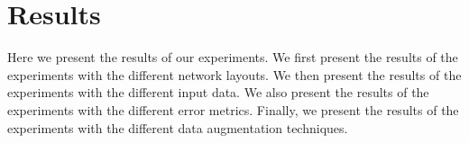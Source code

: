 \section{Results}

Here we present the results of our experiments. We first present the results of the experiments with the different network layouts. We then present the results of the experiments with the different input data. We also present the results of the experiments with the different error metrics. Finally, we present the results of the experiments with the different data augmentation techniques.